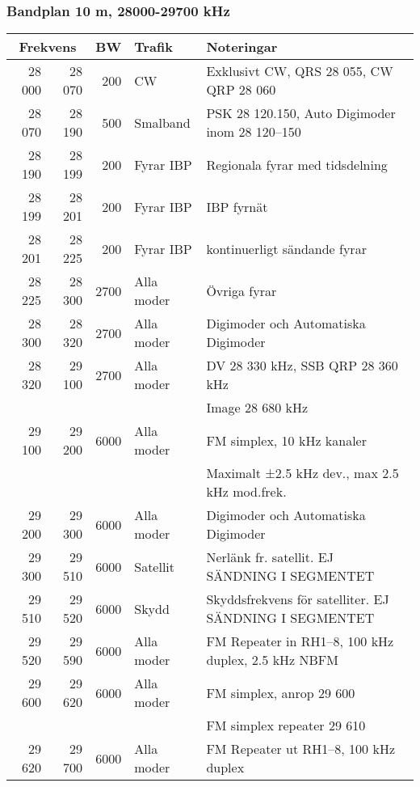 \begin{landscape}
\subsubsection{Bandplan 10 m, 28000-29700 kHz}
\begin{tabular}{rrrll}
\multicolumn{2}{c}{\textbf{Frekvens}} & \textbf{BW} & \textbf{Trafik} & \textbf{Noteringar} \\ \hline
28 000 & 28 070 & 200  & CW         & Exklusivt CW, QRS 28 055, CW QRP 28 060                \\ \hline
28 070 & 28 190 & 500  & Smalband   & PSK 28 120.150, Auto Digimoder inom 28 120--150        \\ \hline
28 190 & 28 199 & 200  & Fyrar IBP  & Regionala fyrar med tidsdelning                        \\ \hline
28 199 & 28 201 & 200  & Fyrar IBP  & IBP fyrnät                                             \\ \hline
28 201 & 28 225 & 200  & Fyrar IBP  & kontinuerligt sändande fyrar                           \\ \hline
28 225 & 28 300 & 2700 & Alla moder & Övriga fyrar                                           \\ \hline
28 300 & 28 320 & 2700 & Alla moder & Digimoder och Automatiska Digimoder                    \\ \hline
28 320 & 29 100 & 2700 & Alla moder & DV 28 330 kHz, SSB QRP 28 360 kHz                      \\
       &        &      &            & Image 28 680 kHz                                       \\ \hline
29 100 & 29 200 & 6000 & Alla moder & FM simplex, 10 kHz kanaler                             \\
       &        &      &            & Maximalt ±2.5 kHz dev., max 2.5 kHz mod.frek.          \\ \hline
29 200 & 29 300 & 6000 & Alla moder & Digimoder och Automatiska Digimoder                    \\ \hline
29 300 & 29 510 & 6000 & Satellit   & Nerlänk fr. satellit. EJ SÄNDNING I SEGMENTET          \\ \hline
29 510 & 29 520 & 6000 & Skydd      & Skyddsfrekvens för satelliter. EJ SÄNDNING I SEGMENTET \\ \hline
29 520 & 29 590 & 6000 & Alla moder & FM Repeater in RH1--8, 100 kHz duplex, 2.5 kHz NBFM    \\ \hline
29 600 & 29 620 & 6000 & Alla moder & FM simplex, anrop 29 600                               \\
       &        &      &            & FM simplex repeater 29 610                             \\ \hline
29 620 & 29 700 & 6000 & Alla moder & FM Repeater ut RH1--8, 100 kHz duplex                  \\ \hline
\end{tabular}
\end{landscape}

\clearpage
